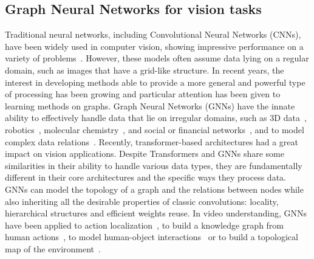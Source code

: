 \subsection{Graph Neural Networks for vision tasks}
Traditional neural networks, including Convolutional Neural Networks (CNNs), have been widely used in computer vision, showing impressive performance on a variety of problems~\cite{li2021survey,khan2020survey,gu2018recent}.
However, these models often assume data lying on a regular domain, such as images that have a grid-like structure.
In recent years, the interest in developing methods able to provide a more general and powerful type of processing has been growing and particular attention has been given to learning methods on graphs.
Graph Neural Networks (GNNs) have the innate ability to effectively handle data that lie on irregular domains, such as 3D data~\cite{simonovsky2017dynamic,wang2019dynamic}, robotics~\cite{pistilli2023graph}, molecular chemistry~\cite{kearnes2016molecular}, and social or financial networks~\cite{fan2019graph}, and to model complex data relations~\cite{sanchez2020learning}.
Recently, transformer-based architectures had a great impact on vision applications.
Despite Transformers and GNNs share some similarities in their ability to handle various data types, they are fundamentally different in their core architectures and the specific ways they process data. GNNs can model the topology of a graph and the relations between nodes while also inheriting all the desirable properties of classic convolutions: locality, hierarchical structures and efficient weights reuse.
In video understanding, GNNs have been applied to action localization~\cite{huang2020improving,zeng2019graph,ghosh2020stacked,rashid2020action}, to build a knowledge graph from human actions~\cite{ghosh2020all}, to model human-object interactions~\cite{dessalene2020egocentric, dessalene2021forecasting} or to build a topological map of the environment~\cite{nagarajan2020ego}.

